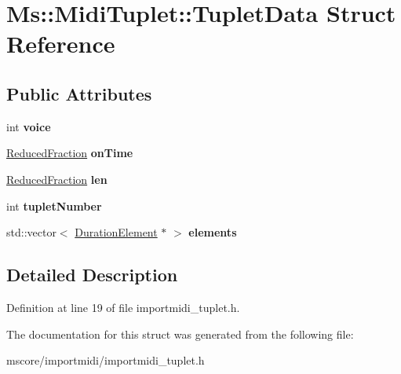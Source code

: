 \hypertarget{struct_ms_1_1_midi_tuplet_1_1_tuplet_data}{}\section{Ms\+:\+:Midi\+Tuplet\+:\+:Tuplet\+Data Struct Reference}
\label{struct_ms_1_1_midi_tuplet_1_1_tuplet_data}
\subsection*{Public Attributes}
\begin{DoxyCompactItemize}
\item 
\mbox{\label{struct_ms_1_1_midi_tuplet_1_1_tuplet_data_adb257af184793b65bea63ff7b2c98af9}} 
int {\bfseries voice}
\item 
\mbox{\label{struct_ms_1_1_midi_tuplet_1_1_tuplet_data_a0682f59f3f9235cabdd1f4a25894dc05}} 
\hyperlink{class_ms_1_1_reduced_fraction}{Reduced\+Fraction} {\bfseries on\+Time}
\item 
\mbox{\label{struct_ms_1_1_midi_tuplet_1_1_tuplet_data_a52f41fbb60cae36dc5f9af859fa0274d}} 
\hyperlink{class_ms_1_1_reduced_fraction}{Reduced\+Fraction} {\bfseries len}
\item 
\mbox{\label{struct_ms_1_1_midi_tuplet_1_1_tuplet_data_a0d3d4c4588d527ee4368668efb11283e}} 
int {\bfseries tuplet\+Number}
\item 
\mbox{\label{struct_ms_1_1_midi_tuplet_1_1_tuplet_data_aaaf81a1ecd117fd1ff7a77204bf173a0}} 
std\+::vector$<$ \hyperlink{class_ms_1_1_duration_element}{Duration\+Element} $\ast$ $>$ {\bfseries elements}
\end{DoxyCompactItemize}


\subsection{Detailed Description}


Definition at line 19 of file importmidi\+\_\+tuplet.\+h.



The documentation for this struct was generated from the following file\+:\begin{DoxyCompactItemize}
\item 
mscore/importmidi/importmidi\+\_\+tuplet.\+h\end{DoxyCompactItemize}
